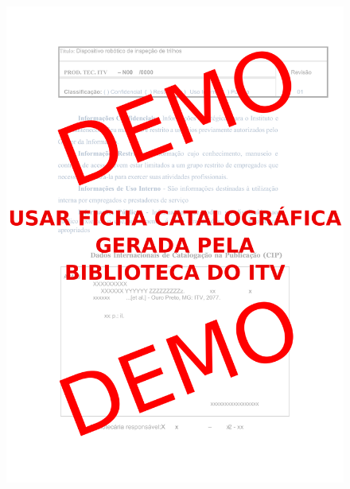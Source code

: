\documentclass[
12pt,					%
openright,				%
oneside,				%
a4paper,				%
chapter=TITLE,			%
%
%
%
%
english,
brazil
]{abnt/abntex2itv_report}
\begin{document}
	
	\frenchspacing
	
	\imprimircapa
	
	{
		\begin{figure}[H]
			\centering
			\includegraphics[width=0.99\linewidth]{img/examples/ficha_catalografica_demo.pdf} %
		\end{figure}
		
		\cleardoublepage
	}
	
	\centering
	\ABNTEXchapterfont\large\textbf{\execsummarytitlename}
	\begin{flushleft}
		\normalsize
		\justify
		\normalfont
		
		\lipsum[2] %
	\end{flushleft}
	\clearpage
	
\end{document}
